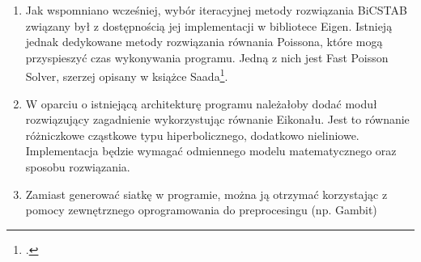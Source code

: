 \begin{enumerate}
	\item Jak wspomniano wcześniej, wybór iteracyjnej metody rozwiązania \mbox{\textsf{BiCSTAB}} związany był z dostępnością jej implementacji w bibliotece \textsf{Eigen}. Istnieją jednak dedykowane metody rozwiązania równania Poissona, które mogą przyspieszyć czas wykonywania programu. Jedną z nich jest \textsf{Fast Poisson Solver}, szerzej opisany w książce \textsf{Saada}\footcite{Saad, s. 58}.
	\item W oparciu o istniejącą architekturę programu należałoby dodać moduł rozwiązujący zagadnienie wykorzystując równanie Eikonału. Jest to równanie różniczkowe cząstkowe typu hiperbolicznego, dodatkowo nieliniowe. Implementacja będzie wymagać odmiennego modelu matematycznego oraz sposobu rozwiązania.
	\item Zamiast generować siatkę w programie, można ją otrzymać korzystając z pomocy zewnętrznego oprogramowania do preprocesingu (np. \mbox{\textsf{Gambit}})
\end{enumerate}